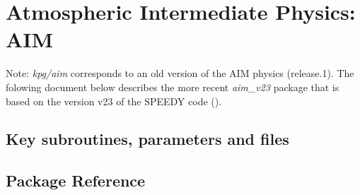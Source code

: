 \section{Atmospheric Intermediate Physics: AIM}
\label{sec:aim}

Note:
 {\it kpg/aim} corresponds to an old version of the AIM physics (release.1).
 The folowing document below describes the more recent {\it aim\_v23} package
 that is based on the version v23 of the SPEEDY code (\cite{molteni:03}).

\subsection{Key subroutines, parameters and files}
\label{sec:pkg:aim:implementation}
\subsection{Package Reference}
